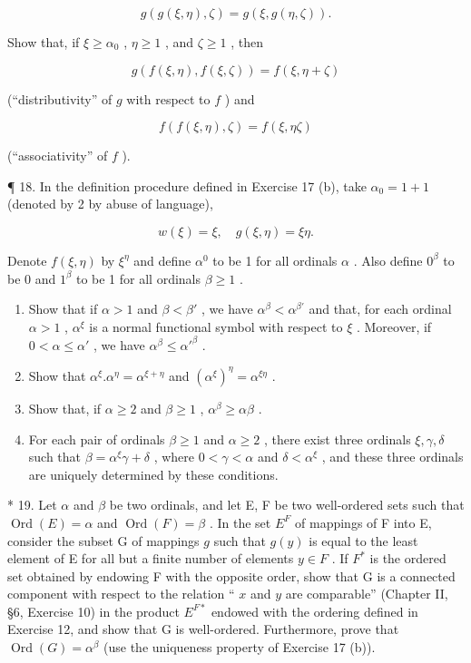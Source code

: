 \[
g (g (\xi , \eta), \zeta) = g (\xi , g (\eta , \zeta)).
\]

Show that, if \(\xi \geqslant \alpha_0\) , \(\eta \geqslant 1\) , and \(\zeta \geqslant 1\) , then

\[
g (f (\xi , \eta), f (\xi , \zeta)) = f (\xi , \eta + \zeta)
\]

(``distributivity'' of \(g\) with respect to \(f\) ) and

\[
f (f (\xi , \eta), \zeta) = f (\xi , \eta \zeta)
\]

(``associativity'' of \(f\) ).

¶ 18. In the definition procedure defined in Exercise 17 (b), take \(\alpha_{0}=1+1\) (denoted by 2 by abuse of language),

\[
w (\xi) = \xi , \quad g (\xi , \eta) = \xi \eta .
\]

Denote \(f(\xi, \eta)\) by \(\xi^{\eta}\) and define \(\alpha^{0}\) to be 1 for all ordinals \(\alpha\) . Also define \(0^{\beta}\) to be 0 and \(1^{\beta}\) to be 1 for all ordinals \(\beta \geqslant 1\) .

\begin{enumerate}
\def\labelenumi{(\alph{enumi})}
\item
  Show that if \(\alpha > 1\) and \(\beta < \beta'\) , we have \(\alpha^{\beta} < \alpha^{\beta'}\) and that, for each ordinal \(\alpha > 1\) , \(\alpha^{\xi}\) is a normal functional symbol with respect to \(\xi\) . Moreover, if \(0 < \alpha \leqslant \alpha'\) , we have \(\alpha^{\beta} \leqslant \alpha'^{\beta}\) .
\item
  Show that \(\alpha^{\xi}.\alpha^{\eta} = \alpha^{\xi +\eta}\) and \((\alpha^{\xi})^{\eta} = \alpha^{\xi \eta}\) .
\item
  Show that, if \(\alpha \geqslant 2\) and \(\beta \geqslant 1\) , \(\alpha^{\beta} \geqslant \alpha \beta\) .
\item
  For each pair of ordinals \(\beta \geqslant 1\) and \(\alpha \geqslant 2\) , there exist three ordinals \(\xi, \gamma, \delta\) such that \(\beta = \alpha^{\xi}\gamma + \delta\) , where \(0 < \gamma < \alpha\) and \(\delta < \alpha^{\xi}\) , and these three ordinals are uniquely determined by these conditions.
\end{enumerate}

* 19. Let \(\alpha\) and \(\beta\) be two ordinals, and let E, F be two well-ordered sets such that \(\operatorname{Ord}(E) = \alpha\) and \(\operatorname{Ord}(F) = \beta\) . In the set \(E^F\) of mappings of F into E, consider the subset G of mappings \(g\) such that \(g(y)\) is equal to the least element of E for all but a finite number of elements \(y \in F\) . If \(F^*\) is the ordered set obtained by endowing F with the opposite order, show that G is a connected component with respect to the relation `` \(x\) and \(y\) are comparable'' (Chapter II, §6, Exercise 10) in the product \(E^{F*}\) endowed with the ordering defined in Exercise 12, and show that G is well-ordered. Furthermore, prove that \(\operatorname{Ord}(G) = \alpha^\beta\) (use the uniqueness property of Exercise 17 (b)).

